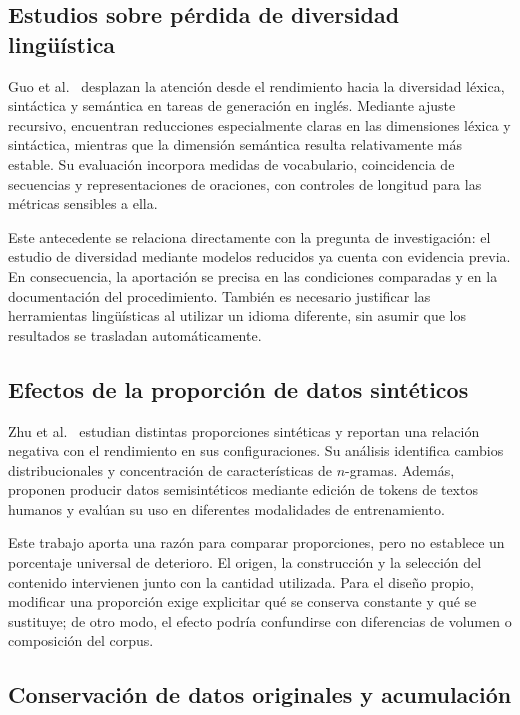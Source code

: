 \documentclass[12pt,letterpaper]{article}
\begin{document}
\subsection{Estudios sobre pérdida de diversidad lingüística}

Guo et al.\ \cite{guo2024} desplazan la atención desde el rendimiento hacia
la diversidad léxica, sintáctica y semántica en tareas de generación en
inglés. Mediante ajuste recursivo, encuentran reducciones especialmente
claras en las dimensiones léxica y sintáctica, mientras que la dimensión
semántica resulta relativamente más estable. Su evaluación incorpora
medidas de vocabulario, coincidencia de secuencias y representaciones
de oraciones, con controles de longitud para las métricas sensibles a ella.

Este antecedente se relaciona directamente con la pregunta de investigación:
el estudio de diversidad mediante modelos reducidos ya cuenta con evidencia
previa. En consecuencia, la aportación se precisa en las condiciones
comparadas y en la documentación del procedimiento. También es necesario
justificar las herramientas lingüísticas al utilizar un idioma diferente,
sin asumir que los resultados se trasladan automáticamente.

\subsection{Efectos de la proporción de datos sintéticos}

Zhu et al.\ \cite{zhu2025} estudian distintas proporciones sintéticas y
reportan una relación negativa con el rendimiento en sus configuraciones.
Su análisis identifica cambios distribucionales y concentración de
características de \(n\)-gramas. Además, proponen producir datos
semisintéticos mediante edición de tokens de textos humanos y evalúan
su uso en diferentes modalidades de entrenamiento.

Este trabajo aporta una razón para comparar proporciones, pero no establece
un porcentaje universal de deterioro. El origen, la construcción y la
selección del contenido intervienen junto con la cantidad utilizada.
Para el diseño propio, modificar una proporción exige explicitar qué
se conserva constante y qué se sustituye; de otro modo, el efecto podría
confundirse con diferencias de volumen o composición del corpus.

\subsection{Conservación de datos originales y acumulación}
\end{document}
